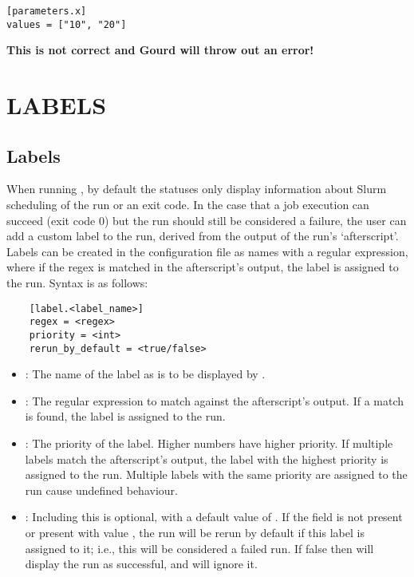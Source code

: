 \documentclass[a4paper,english]{article}
\begin{document}
\begin{adjustwidth}{18pt}{0pt}
\begin{verbatim}
[parameters.x]
values = ["10", "20"]
        \end{verbatim}

        \textbf{This is not correct and Gourd will throw out an error!}


  \section{LABELS}
  \subsection{Labels}
  When running  , by default the statuses only display information
  about Slurm scheduling of the run or an exit code.
  In the case that a job execution can succeed (exit code 0) but the run should still
  be considered a failure, the user can add a custom label to the run, derived from
  the output of the run's `afterscript'.
  Labels can be created in the configuration file as names with a regular expression,
  where if the regex is matched in the afterscript's output, the label is assigned to the run.
  Syntax is as follows:

  \begin{verbatim}
    [label.<label_name>]
    regex = <regex>
    priority = <int>
    rerun_by_default = <true/false>
  \end{verbatim}

  \begin{itemize}
      \item {}: The name of the label as is to be displayed by  .
      \item {}: The regular expression to match against the afterscript's output.
      If a match is found, the label is assigned to the run.
      \item {}: The priority of the label.
      Higher numbers have higher priority.
      If multiple labels match the afterscript's output, the label with the highest priority is assigned to the run.
      Multiple labels with the same priority are assigned to the run cause undefined behaviour.
      \item {}: Including this is optional, with a default value of .
      If the field is not present or present with value , the run will be rerun by default if
      this label is assigned to it; i.e., this will be considered a failed run.
      If false then   will display the run as successful, and   will ignore it.
  \end{itemize}


\end{adjustwidth}
\end{document}
